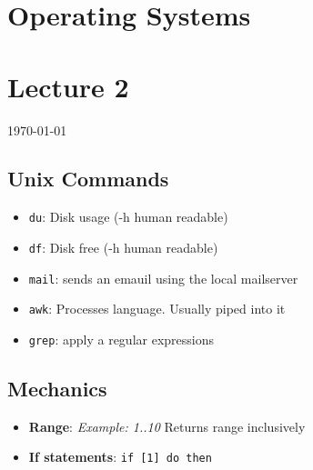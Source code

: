 \documentclass[12pt]{article}
\begin{document}
{\centering
\section*{Operating Systems}
\section*{Lecture 2}
\indent\today
}

\subsection*{Unix Commands}
\begin{itemize}
    \item \texttt{du}: Disk usage (-h human readable)
    \item \texttt{df}: Disk free (-h human readable)
    \item \texttt{mail}: sends an emauil using the local mailserver
    \item \texttt{awk}: Processes language. Usually piped into it
    \item \texttt{grep}: apply a regular expressions
\end{itemize}

\subsection*{Mechanics}
\begin{itemize}
    \item \textbf{Range}: \textit{Example: {1..10}} Returns range inclusively
    \item \textbf{If statements}:
        \texttt{if [1] do then}
\end{itemize}
\end{document}
